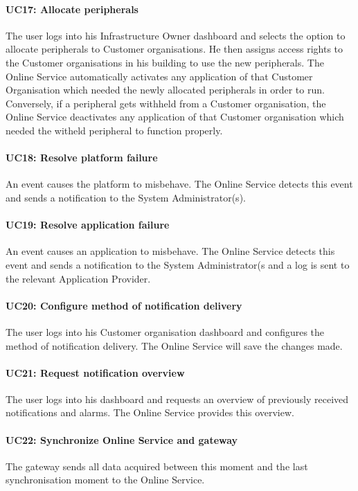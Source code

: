 \paragraph{UC17: Allocate peripherals}
The user logs into his Infrastructure Owner dashboard and selects the option to allocate peripherals to Customer organisations. He then assigns access rights to the Customer organisations in his building to use the new peripherals. The Online Service automatically activates any application of that Customer Organisation which needed the newly allocated peripherals in order to run. Conversely, if a peripheral gets withheld from a Customer organisation, the Online Service deactivates any application of that Customer organisation which needed the witheld peripheral to function properly.

\paragraph{UC18: Resolve platform failure}
An event causes the platform to misbehave. The Online Service detects this event and sends a notification to the System Administrator(s).

\paragraph{UC19: Resolve application failure}
An event causes an application to misbehave. The Online Service detects this event and sends a notification to the System Administrator(s and a log is sent to the relevant Application Provider.

\paragraph{UC20: Configure method of notification delivery}
The user logs into his Customer organisation dashboard and configures the method of notification delivery. The Online Service will save the changes made.

\paragraph{UC21: Request notification overview}
The user logs into his dashboard and requests an overview of previously received notifications and alarms. The Online Service provides this overview.

\paragraph{UC22: Synchronize Online Service and gateway}
The gateway sends all data acquired between this moment and the last synchronisation moment to the Online Service.

